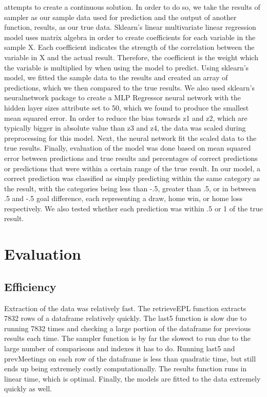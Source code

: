 \documentclass[sigconf]{acmart}
\begin{document}
attempts to create a continuous solution. In order to do so, we take the results of sampler as our sample data used for prediction and the output of another function, results, as our true data. Sklearn's linear multivariate linear regression model uses matrix algebra in order to create coefficients for each variable in the sample X. Each coefficient indicates the strength of the correlation between the variable in X and the actual result. Therefore, the coefficient is the weight which the variable is multiplied by when using the model to predict. Using sklearn's model, we fitted the sample data to the results and created an array of predictions, which we then compared to the true results.  We also used sklearn's neuralnetwork package to create a MLP Regressor neural network with the hidden layer sizes attribute set to 50, which we found to produce the smallest mean squared error. In order to reduce the bias towards z1 and z2, which are typically bigger in absolute value than z3 and z4, the data was scaled during preprocessing for this model. Next, the neural network fit the scaled data to the true results. Finally, evaluation of the model was done based on mean squared error between predictions and true results and percentages of correct predictions or predictions that were within a certain range of the true result. In our model, a correct prediction was classified as simply predicting within the same category as the result, with the categories being less than -.5, greater than .5, or in between .5 and -.5 goal difference, each representing a draw, home win, or home loss respectively. We also tested whether each prediction was within .5 or 1 of the true result.


\section{Evaluation}
\subsection{Efficiency}
Extraction of the data was relatively fast. The retrieveEPL function extracts 7832 rows of a dataframe relatively quickly. The last5 function is slow due to running 7832 times and checking a large portion of the dataframe for previous results each time. The sampler function is by far the slowest to run due to the large number of comparisons and indexes it has to do. Running last5 and prevMeetings on each row of the dataframe is less than quadratic time, but still ends up being extremely costly computationally. The results function runs in linear time, which is optimal. Finally, the models are fitted to the data extremely quickly as well.
\end{document}
